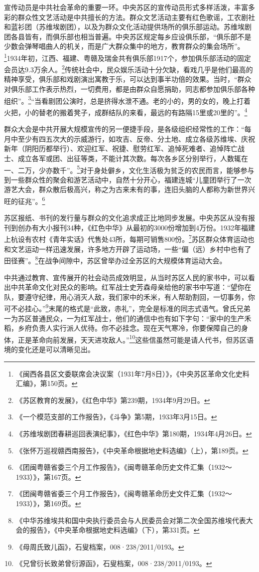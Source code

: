 宣传动员是中共社会革命的重要一环。中央苏区的宣传动员形式多样活泼，丰富多彩的群众性文艺活动是中共擅长的方法。群众文艺活动主要有红色歌谣，工农剧社和蓝衫团（苏维埃剧团），以及为群众文化活动提供场所的俱乐部运动。苏维埃剧团各县皆有，而俱乐部也相当普遍。中央苏区规定每乡应设俱乐部，“俱乐部不是少数会弹琴唱曲人的机关，而是广大群众集中的地方，教育群众的集会场所”。\footnote{《闽西各县区文委联席会决议案（1931年7月8日）》，《中央苏区革命文化史料汇编》，第150页。}1934年初，江西、福建、粤赣及瑞金共有俱乐部1917个，参加俱乐部活动的固定会员达9.3万余人。\footnote{《苏区教育的发展》，《红色中华》第239期，1934年9月29日。}传统社会中，民众娱乐活动十分欠缺，看戏几乎是他们最高的精神享受，俱乐部和戏剧演出寓教于乐，可以达到事半功倍的效果。当时，“群众对俱乐部工作表示热烈，一切费用，都是由群众自愿捐助，同志都参加俱乐部各种组织”。\footnote{《一个模范支部的工作报告》，《斗争》第5期，1933年3月15日。}“当看剧团公演时，总是挤得水泄不通。老的小的，男的女的，晚上打着火把，小的替老的搬着凳子，成群结队的来看，最远的有路隔15里或20里的”。\footnote{《苏维埃剧团春耕巡回表演纪事》，《红色中华》第180期，1934年4月26日。}


群众大会是中共开展大规模宣传的另一便捷手段，是各级组织经常性的工作：“每月中至少有四五次大的示威游行，如攻吉、反帝、分土地、成立各级苏维埃、庆祝新年（阴阳历都举行）、欢迎红军、祝捷、慰劳红军、追悼死难者、追悼阵亡战士、成立各军或团、出征等类，不能计其次数。每次各乡区分别举行，人数辄在一、二万，少亦数千”。\footnote{《张怀万巡视赣西南报告》，《中央革命根据地史料选编》（上），第189页。}对于身处僻乡，文化生活极为贫乏的农民而言，能够参与到一些群众性的聚会和游艺活动中，自然十分开心，福建连城“儿童团举行了一次游艺大会，群众散后极高兴，称之为古来未有的事，连旧头脑的人都称为新世界兴旺的征兆”。\footnote{《团闽粤赣省委三个月工作报告》，《闽粤赣革命历史文件汇集（1932～1933）》，第167页。}


苏区报纸、书刊的发行量与群众的文化追求成正比地同步发展。中央苏区从没有报刊到创办有大小报刊34种，《红色中华》从最初的3000份增加到4万份。1932年福建上杭设有农村《青年实话》代售处43所，每期可销售800份。\footnote{《团闽粤赣省委三个月工作报告》，《闽粤赣革命历史文件汇集（1932～1933）》，第169页。}苏区群众体育运动也和文艺运动一样迅速发展，许多地方开辟了运动场，一些“偏（远）乡村中也有了田径赛”。\footnote{《中华苏维埃共和国中央执行委员会与人民委员会对第二次全国苏维埃代表大会的报告》，《中央革命根据地史料选编》（下），第331页。}在战争间隙中，苏区曾举办过全苏区的大规模体育运动大会。


中共通过教育、宣传展开的社会动员成效明显，从当时苏区人民的家书中，可以看出中共革命文化对民众的影响。红军战士史芳森母亲给他的家书中写道：“望你在队，要遵守纪律，用心消灭人敌，我们家中的禾米，有人帮助割回，一切事务，你可不必挂心。”\footnote{《母周氏致儿函》，石叟档案，008·238/2011/0193。}末尾的格式是“此致，赤礼”，完全是标准的同志式语气。曾氏兄弟一为苏区普通民众，一为红军战士，他们的通信中也有如下字句：“家中的生产禾稻，乡府负责人实行派人优待。你不必挂念。现在天气寒冷，你要保障自己的身体，正是革命向前发展，天天进攻敌人。”\footnote{《兄曾衍长致弟曾衍源函》，石叟档案，008·238/2011/0193。}这些信虽然可能是请人代书，但苏区语境的变化还是可以清晰见出。


